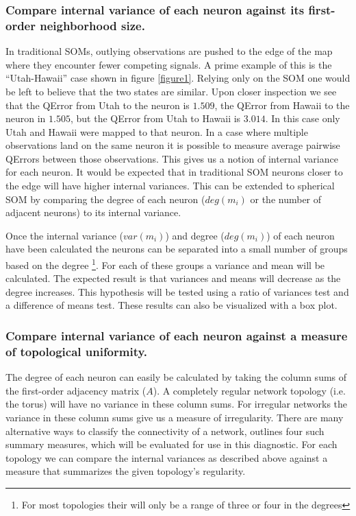 \documentclass[10pt,titlepage]{article}
\begin{document}
\subsubsection{Compare internal variance of each neuron against its first-order neighborhood size.}
In traditional SOMs, outlying observations are pushed to the edge of the map where
they encounter fewer competing signals. A prime example of this is the
``Utah-Hawaii'' case shown in figure \ref{figure1}.  Relying only on the SOM one
would be left to believe that the two states are similar. Upon closer inspection we see
that the QError from Utah to the neuron is $1.509$, the QError from Hawaii to
the neuron in $1.505$, but the QError from Utah to Hawaii is $3.014$. In this
case only Utah and Hawaii were mapped to that neuron.  In a case where multiple
observations land on the same neuron it is possible to measure average pairwise
QErrors between those observations.  This gives us a notion of internal variance for
each neuron. It would be expected that in traditional SOM neurons closer to the
edge will have higher internal variances. This can be extended to spherical SOM
by comparing the degree of each neuron ($deg(m_i)$ or the number of adjacent
neurons) to its internal variance.

Once the internal variance ($var(m_i)$) and degree ($deg(m_i)$) of each neuron
have been calculated the neurons can be separated into a small number of groups
based on the degree \footnote{For most topologies their will only be a range of three or
four in the degrees}.  For each of these groups a variance and mean will be calculated.
The expected result is that variances and means will decrease as the degree
increases.  This hypothesis will be tested using a ratio of variances test and a
difference of means test.  These results can also be visualized with a box plot.

\subsubsection{Compare internal variance of each neuron against a measure of topological uniformity.}
The degree of each neuron can easily be calculated by taking the column sums of
the first-order adjacency matrix ($A$).  A completely regular network
topology (i.e. the torus) will have no variance in these column sums.  For
irregular networks the variance in these column sums give us a measure of
irregularity. There are many alternative ways to classify the connectivity of a
network, \cite{florax95} outlines four such summary measures, which will be
evaluated for use in this diagnostic.  For each topology we can compare the internal
variances as described above against a measure that summarizes the given
topology's regularity.  
\end{document}
